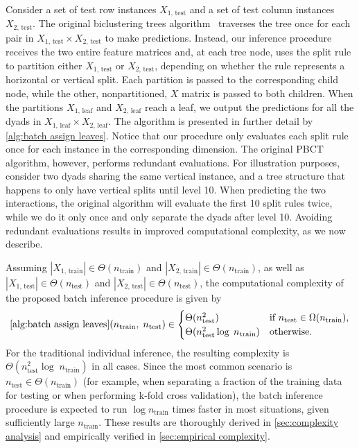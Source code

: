 \documentclass[sn-mathphys-num]{sn-jnl}%
\theoremstyle{thmstyleone}%
\theoremstyle{thmstyletwo}%
\theoremstyle{thmstylethree}%
\begin{document}
Consider a set of test row instances $X_\text{1, test}$ and a set of test column instances $X_\text{2, test}$.
The original biclustering trees algorithm~\cite{pliakos_global_2018} traverses the tree once for each pair in $X_\text{1, test} \times X_\text{2, test}$ to make predictions. Instead, our inference procedure receives the two entire feature matrices and, at each tree node, uses the split rule to partition either $X_\text{1, test}$ or $X_\text{2, test}$, depending on whether the rule represents a horizontal or vertical split. Each partition is passed to the corresponding child node, while the other, nonpartitioned, $X$ matrix is passed to both children. When the partitions $X_\text{1, leaf}$ and $X_\text{2, leaf}$ reach a leaf, we output the predictions for all the dyads in $X_\text{1, leaf} \times X_\text{2, leaf}$.
The algorithm is presented in further detail by \autoref{alg:batch assign leaves}.
Notice that our procedure only evaluates each split rule once for each instance in the corresponding dimension. The original PBCT algorithm, however, performs redundant evaluations. For illustration purposes, consider two dyads sharing the same vertical instance, and a tree structure that happens to only have vertical splits until level 10. When predicting the two interactions, the original algorithm will evaluate the first 10 split rules twice, while we do it only once and only separate the dyads after level 10. Avoiding redundant evaluations results in improved computational complexity, as we now describe.

Assuming $|X_\text{1, train}| \in \Theta(n_\text{train})$ and $|X_\text{2, train}| \in \Theta(n_\text{train})$, as well as $|X_\text{1, test}| \in \Theta(n_\text{test})$ and $|X_\text{2, test}| \in \Theta(n_\text{test})$, the computational complexity of the proposed batch inference procedure is given by
%
\begin{align}
    \label{eq:complexity batch inference}
    \text{\ref{alg:batch assign leaves}}(n_\text{train},\; n_\text{test})
        \in \begin{cases}
            \Theta(n_\text{test}^2) & \text{if }n_\text{test} \in \Omega(n_\text{train})\text{,}\\
            \Theta(n_\text{test}^2 \log\;n_\text{train}) & \text{otherwise.}
        \end{cases}
\end{align}
%
For the traditional individual inference, the resulting complexity is $\Theta(n_\text{test}^2 \log\;n_\text{train})$ in all cases.
Since the most common scenario is $n_\text{test} \in \Theta(n_\text{train})$ (for example, when separating a fraction of the training data for testing or when performing k-fold cross validation), the batch inference procedure is expected to run $\log n_\text{train}$ times faster in most situations, given sufficiently large $n_\text{train}$.
These results are thoroughly derived in \autoref{sec:complexity analysis} and empirically verified in \autoref{sec:empirical complexity}.
\end{document}
